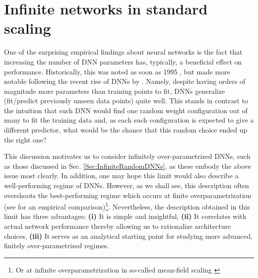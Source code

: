 \chapter{Infinite networks in standard scaling}

One of the surprising empirical findings about neural networks is the fact that increasing the number of DNN parameters has, typically, a beneficial effect on performance. Historically, this was noted as soon as 1995 \citep{Breiman2018ReflectionsAR}, but made more notable following the recent rise of DNNs by \cite{Neyshabur2014,Zhang2016}. Namely, despite having orders of magnitude more parameters than training points to fit, DNNs generalize (fit/predict previously unseen data points) quite well. This stands in contrast to the intuition that such DNN would find one random weight configuration out of many to fit the training data and, as each such configuration is expected to give a different predictor, what would be the chance that this random choice ended up the right one? 

This discussion motivates us to consider infinitely over-parametrized DNNs, such as those discussed in Sec. \ref{Sec:InfiniteRandomDNNs}, as these embody the above issue most clearly. In addition, one may hope this limit would also describe a well-performing regime of DNNs. However, as we shall see, this description often overshoots the best-performing regime which occurs at finite overparametrization (see 
 \cite{novak2018bayesian} for an empirical comparison)\footnote{Or at infinite overparametrization in so-called mean-field scaling \cite{yang2022tensorprogramsvtuning,MeiMeanField2018}}. Nevertheless, the description obtained in this limit has three advantages: {\bf (i)} It is simple and insightful, {\bf (ii)} It correlates with actual network performance \citep{novak2018bayesian,lee2019wide} thereby allowing us to rationalize architecture choices, {\bf (iii)} It serves as an analytical starting point for studying more advanced, finitely over-parametrized regimes.


